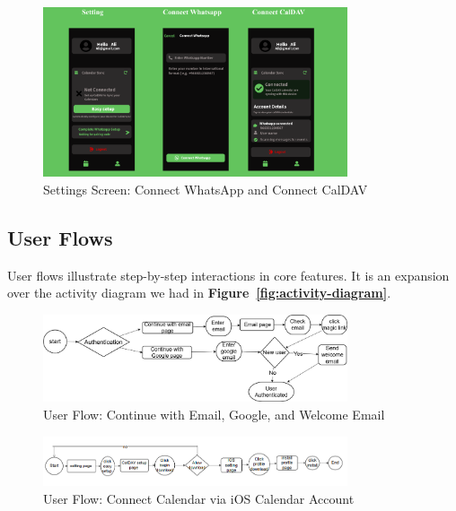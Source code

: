 \begin{figure}[H]
    \centering
    \includegraphics[width=0.8\textwidth]{images/front-end3.png}
    \caption{Settings Screen: Connect WhatsApp and Connect CalDAV}
    \label{fig:wireframe-settings}
\end{figure}

\subsection{User Flows}

User flows illustrate step-by-step interactions in core features. It is an expansion over the activity diagram we had in \textbf{Figure~\ref{fig:activity-diagram}}.

\begin{figure}[H]
    \centering
    \includegraphics[width=0.8\textwidth]{images/Login user flow.drawio.png}
    \caption{User Flow: Continue with Email, Google, and Welcome Email}
    \label{fig:userflow-login}
\end{figure}

\begin{figure}[H]
    \centering
    \includegraphics[width=0.8\textwidth]{images/add jadwal calendar to ios calendar account.png}
    \caption{User Flow: Connect Calendar via iOS Calendar Account}
    \label{fig:userflow-connect-calendar}
\end{figure}

